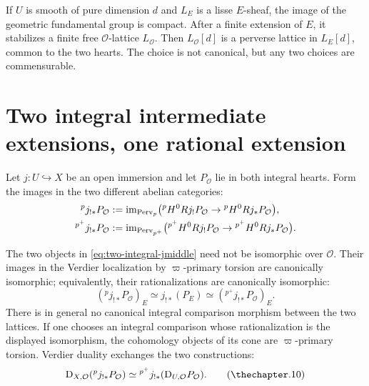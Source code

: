 If \(U\) is smooth of pure dimension \(d\) and \(L_E\) is a lisse
\(E\)-sheaf, the image of the geometric fundamental group is compact.  After
a finite extension of \(E\), it stabilizes a finite free
\(\mathcal O\)-lattice \(L_{\mathcal O}\).  Then
\(L_{\mathcal O}[d]\) is a perverse lattice in \(L_E[d]\), common to the two
hearts.  The choice is not canonical, but any two choices are commensurable.

\section{Two integral intermediate extensions, one rational extension}

Let \(j:U\hookrightarrow X\) be an open immersion and let
\(P_{\mathcal O}\) lie in both integral hearts.  Form the images in the two
different abelian categories:
\begin{equation}
\begin{aligned}
 {}^p j_{!*}P_{\mathcal O}
   &:=\operatorname{im}_{\operatorname{Perv}_p}\bigl({}^pH^0Rj_!P_{\mathcal O}\to
                         {}^pH^0Rj_*P_{\mathcal O}\bigr),\\
 {}^{p^+}j_{!*}P_{\mathcal O}
   &:=\operatorname{im}_{\operatorname{Perv}_{p^+}}\bigl({}^{p^+}H^0Rj_!P_{\mathcal O}\to
                             {}^{p^+}H^0Rj_*P_{\mathcal O}\bigr).
\end{aligned}
\label{eq:two-integral-jmiddle}
\end{equation}

\begin{theorem}
\label{thm:two-integral-intermediate-extensions}
The two objects in \eqref{eq:two-integral-jmiddle} need not be isomorphic
over \(\mathcal O\).  Their images in the Verdier localization by
\(\varpi\)-primary torsion are canonically isomorphic; equivalently, their
rationalizations are canonically isomorphic:
\[
  ({}^p j_{!*}P_{\mathcal O})_E
  \simeq j_{!*}(P_E)\simeq
  ({}^{p^+}j_{!*}P_{\mathcal O})_E.
\tag{\thechapter.9}\label{eq:two-jmiddle-rationalize}
\]
There is in general no canonical integral comparison morphism between the
two lattices.  If one chooses an integral comparison whose rationalization
is the displayed isomorphism, the cohomology objects of its cone are
\(\varpi\)-primary torsion.  Verdier duality exchanges the two constructions:
\[
  \D_{X,\mathcal O}({}^p j_{!*}P_{\mathcal O})\simeq
  {}^{p^+}j_{!*}(\D_{U,\mathcal O}P_{\mathcal O}).
\tag{\thechapter.10}\label{eq:integral-jmiddle-duality}
\]
\end{theorem}

